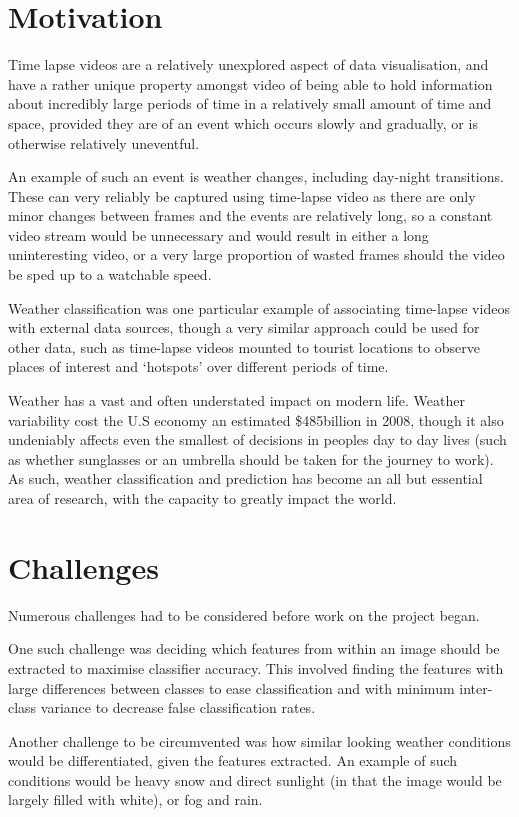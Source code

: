 \documentclass[a4paper,12pt,twoside]{report}
\begin{document}
\section{Motivation}
Time lapse videos are a relatively unexplored aspect of data visualisation, and have a rather unique property amongst video of being able to hold information about incredibly large periods of time in a relatively small amount of time and space, provided they are of an event which occurs slowly and gradually, or is otherwise relatively uneventful.

An example of such an event is weather changes, including day-night transitions. These can very reliably be captured using time-lapse video as there are only minor changes between frames and the events are relatively long, so a constant video stream would be unnecessary and would result in either a long uninteresting video, or a very large proportion of wasted frames should the video be sped up to a watchable speed.

Weather classification was one particular example of associating time-lapse videos with external data sources, though a very similar approach could be used for other data, such as time-lapse videos mounted to tourist locations to observe places of interest and `hotspots' over different periods of time.

Weather has a vast and often understated impact on modern life. Weather variability cost the U.S economy an estimated \$485billion in 2008\cite{econweather}, though it also undeniably affects even the smallest of decisions in peoples day to day lives (such as whether sunglasses or an umbrella should be taken for the journey to work). As such, weather classification and prediction has become an all but essential area of research, with the capacity to greatly impact the world.

\section{Challenges}
Numerous challenges had to be considered before work on the project began.

One such challenge was deciding which features from within an image should be extracted to maximise classifier accuracy. This involved finding the features with large differences between classes to ease classification and with minimum inter-class variance to decrease false classification rates.

Another challenge to be circumvented was how similar looking weather conditions would be differentiated, given the features extracted. An example of such conditions would be heavy snow and direct sunlight (in that the image would be largely filled with white), or fog and rain.
\end{document}
